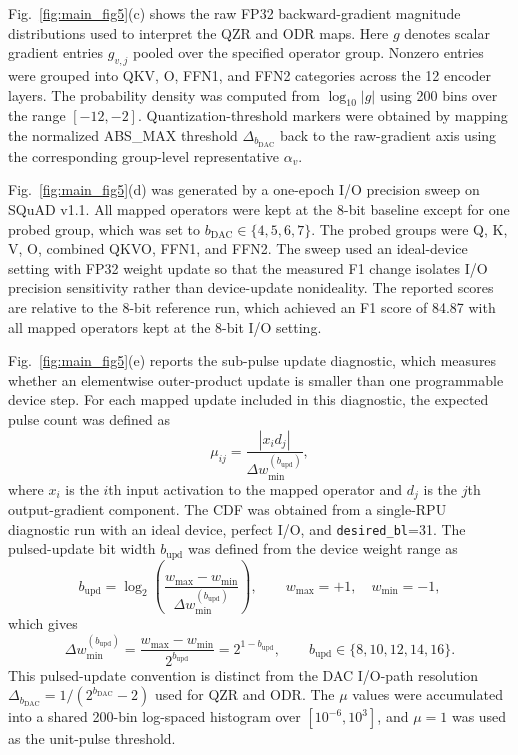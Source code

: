\documentclass[AMA,LATO2COL]{WileyNJDv5}
\begin{document}
Fig.~\ref{fig:main_fig5}(c) shows the raw FP32 backward-gradient magnitude distributions used to interpret the QZR and ODR maps. 
Here \(g\) denotes scalar gradient entries \(g_{v,j}\) pooled over the specified operator group. 
Nonzero entries were grouped into QKV, O, FFN1, and FFN2 categories across the 12 encoder layers. 
The probability density was computed from \(\log_{10}|g|\) using 200 bins over the range \([-12,-2]\). 
Quantization-threshold markers were obtained by mapping the normalized ABS\_MAX threshold \(\Delta_{b_{\mathrm{DAC}}}\) back to the raw-gradient axis using the corresponding group-level representative \(\alpha_v\).

Fig.~\ref{fig:main_fig5}(d) was generated by a one-epoch I/O precision sweep on SQuAD v1.1. 
All mapped operators were kept at the 8-bit baseline except for one probed group, which was set to \(b_{\mathrm{DAC}}\in\{4,5,6,7\}\). 
The probed groups were Q, K, V, O, combined QKVO, FFN1, and FFN2. 
The sweep used an ideal-device setting with FP32 weight update so that the measured F1 change isolates I/O precision sensitivity rather than device-update nonideality. 
The reported scores are relative to the 8-bit reference run, which achieved an F1 score of 84.87 with all mapped operators kept at the 8-bit I/O setting.

Fig.~\ref{fig:main_fig5}(e) reports the sub-pulse update diagnostic, which measures whether an elementwise outer-product update is smaller than one programmable device step. 
For each mapped update included in this diagnostic, the expected pulse count was defined as
\begin{equation}
\mu_{ij}
=
\frac{|x_i d_j|}{\Delta w_{\min}^{(b_{\mathrm{upd}})}},
\label{eq:mu_def}
\end{equation}
where \(x_i\) is the \(i\)th input activation to the mapped operator and \(d_j\) is the \(j\)th output-gradient component. 
The CDF was obtained from a single-RPU diagnostic run with an ideal device, perfect I/O, and \texttt{desired\_bl}=31. 
The pulsed-update bit width \(b_{\mathrm{upd}}\) was defined from the device weight range as
\[
b_{\mathrm{upd}}
=
\log_2
\left(
\frac{w_{\max}-w_{\min}}{\Delta w_{\min}^{(b_{\mathrm{upd}})}}
\right),
\qquad
w_{\max}=+1,\quad w_{\min}=-1,
\]
which gives
\[
\Delta w_{\min}^{(b_{\mathrm{upd}})}
=
\frac{w_{\max}-w_{\min}}{2^{b_{\mathrm{upd}}}}
=
2^{1-b_{\mathrm{upd}}},
\qquad
b_{\mathrm{upd}}\in\{8,10,12,14,16\}.
\]
This pulsed-update convention is distinct from the DAC I/O-path resolution \(\Delta_{b_{\mathrm{DAC}}}=1/(2^{b_{\mathrm{DAC}}}-2)\) used for QZR and ODR. 
The \(\mu\) values were accumulated into a shared 200-bin log-spaced histogram over \([10^{-6},10^{3}]\), and \(\mu=1\) was used as the unit-pulse threshold.
\end{document}
